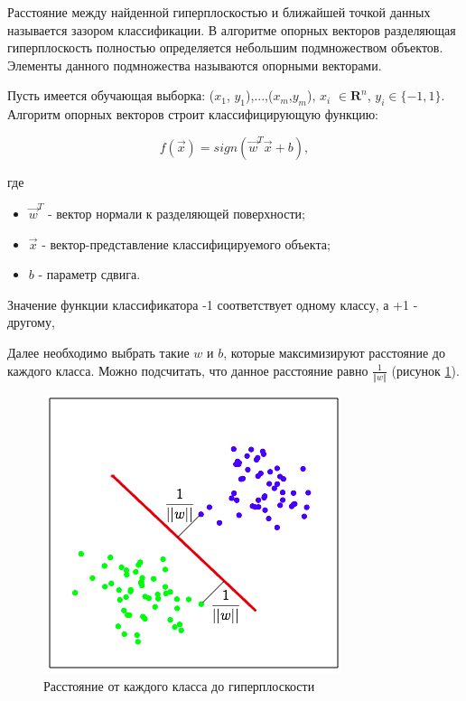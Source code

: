 Расстояние между найденной гиперплоскостью и ближайшей точкой данных называется зазором классификации. В алгоритме опорных векторов разделяющая гиперплоскость полностью определяется небольшим подмножеством объектов. Элементы данного подмножества называются опорными векторами. 



Пусть имеется обучающая выборка: ($x_1$, $y_1$),...,($x_m$,$y_m$), $x_i$ $\in \mathbf{R}^n$, $y_i \in \{-1,1\}$.
Алгоритм опорных векторов строит классифицирующую функцию:

\begin{equation}
f(\vec x) = sign(\vec w^T \vec x + b), 
\end{equation}

где 

\begin{itemize}
	\item $\vec w^T$ - вектор нормали к разделяющей поверхности;
	\item$ \vec x$ - вектор-представление классифицируемого объекта;
	\item $b$ - параметр сдвига.
\end{itemize}

Значение  функции классификатора -1 соответствует одному классу, а +1 - другому, 

Далее необходимо выбрать такие $w$ и $b$, которые максимизируют расстояние до каждого класса. Можно подсчитать, что данное расстояние равно $\frac{1}{\Vert w \Vert}$ (рисунок \ref{anal:w}).

\begin{figure}[h!]
	\centering
	\includegraphics[scale=0.8]{inc/img/w.png}
	\caption{Расстояние от каждого класса до гиперплоскости}
	\label{anal:w}
\end{figure}

